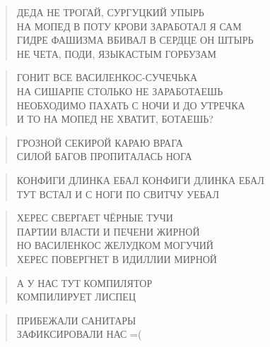 \poemtitle{***}
\begin{verse}
ДЕДА НЕ ТРОГАЙ, СУРГУЦКИЙ УПЫРЬ\\
НА МОПЕД В ПОТУ КРОВИ ЗАРАБОТАЛ Я САМ\\
ГИДРЕ ФАШИЗМА ВБИВАЛ В СЕРДЦЕ ОН ШТЫРЬ\\
НЕ ЧЕТА, ПОДИ, ЯЗЫКАСТЫМ ГОРБУЗАМ
\end{verse}

\poemtitle{***}
\begin{verse}
ГОНИТ ВСЕ ВАСИЛЕНКОС-СУЧЕЧЬКА\\
НА СИШАРПЕ СТОЛЬКО НЕ ЗАРАБОТАЕШЬ\\
НЕОБХОДИМО ПАХАТЬ С НОЧИ И ДО УТРЕЧКА\\
И ТО НА МОПЕД НЕ ХВАТИТ, БОТАЕШЬ?
\end{verse}

\poemtitle{***}
\begin{verse}
ГРОЗНОЙ СЕКИРОЙ КАРАЮ ВРАГА\\
СИЛОЙ БАГОВ ПРОПИТАЛАСЬ НОГА
\end{verse}

\poemtitle{***}
\begin{verse}
КОНФИГИ ДЛИНКА ЕБАЛ КОНФИГИ ДЛИНКА ЕБАЛ\\
ТУТ ВСТАЛ И С НОГИ ПО СВИТЧУ УЕБАЛ
\end{verse}

\poemtitle{***}
\begin{verse}
ХЕРЕС СВЕРГАЕТ ЧЁРНЫЕ ТУЧИ\\
ПАРТИИ ВЛАСТИ И ПЕЧЕНИ ЖИРНОЙ\\
НО ВАСИЛЕНКОС ЖЕЛУДКОМ МОГУЧИЙ\\
ХЕРЕС ПОВЕРГНЕТ В ИДИЛЛИИ МИРНОЙ
\end{verse}

\poemtitle{***}
\begin{verse}
А У НАС ТУТ КОМПИЛЯТОР\\
КОМПИЛИРУЕТ ЛИСПЕЦ
\end{verse}

\poemtitle{***}
\begin{verse}
ПРИБЕЖАЛИ САНИТАРЫ\\
ЗАФИКСИРОВАЛИ НАС =(
\end{verse}

